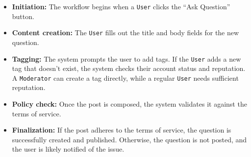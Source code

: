 \begin{itemize}
\item
\protect{}\label{s_NZe96yj1YOjxY19t1bG}
\textbf{Initiation:} The workflow begins when a \texttt{User} clicks the ``Ask Question'' button.
\item
\protect{}\label{IwJUnWY407iJXJzehvvga}
\textbf{Content creation:} The \texttt{User} fills out the title and body fields for the new question.
\item
\protect{}\label{uj1si-98NOh4uDXzbZbqU}
\textbf{Tagging:} The system prompts the user to add tags. If the \texttt{User} adds a new tag that doesn't exist, the system checks their account status and reputation. A \texttt{Moderator} can create a tag directly, while a regular \texttt{User} needs sufficient reputation.
\item
\protect{}\label{VkjP1VXO3sqtHUHSH4Ri2}
\textbf{Policy check:} Once the post is composed, the system validates it against the terms of service.
\item
\protect{}\label{xbRVbmQ8j9j6dk0gqeUCR}
\textbf{Finalization:} If the post adheres to the terms of service, the question is successfully created and published. Otherwise, the question is not posted, and the user is likely notified of the issue.
\end{itemize}

